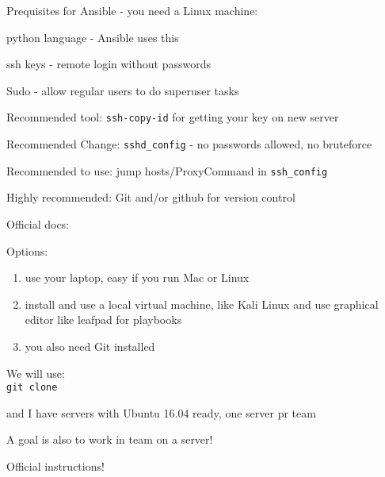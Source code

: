 \documentclass[18pt,landscape,a4paper,footrule]{foils}
\begin{document}
Prequisites for Ansible - you need a Linux machine:
\begin{list2}
\item python language - Ansible uses this
\item ssh keys - remote login without passwords
\item Sudo - allow regular users to do superuser tasks
\item Recommended tool: \verb+ssh-copy-id+ for getting your key on new server
\item Recommended Change: \verb+sshd_config+ - no passwords allowed, no bruteforce
\item Recommended to use: jump hosts/ProxyCommand in \verb+ssh_config+
\item Highly recommended: Git and/or github for version control
\end{list2}

Official docs:\\

Options:
\begin{enumerate}
\item use your laptop, easy if you run Mac or Linux
\item install and use a local virtual machine, like Kali Linux and use graphical editor like leafpad for playbooks
\item you also need Git installed
\end{enumerate}

We will use:\\
\verb+git clone +

\vskip 1cm
and I have servers with Ubuntu 16.04 ready, one server pr team

\vskip 1cm
\centerline{A goal is also to work in team on a server!}


Official instructions!\\

\end{document}

